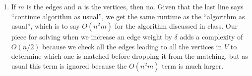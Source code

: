 \documentclass[a4paper]{article}
\begin{document}
\begin{enumerate}
\begin{enumerate}
\begin{algorithmic}
	\end{algorithmic}
	\item If $m$ is the edges and $n$ is the vertices, then no.  Given that the last line says ``continue algorithm as usual'', we get the same runtime as the ``algorithm as usual'', which is to say $O(n^2 m)$ for the algorithm discussed in class.  Our piece for solving when we increase an edge weight by $\delta$ adds a complexity of $O(n/2)$ because we check all the edges leading to all the vertices in $V$ to determine which one is matched before dropping it from the matching, but as usual this term is ignored because the $O(n^2 m)$ term is much larger.
	\end{enumerate}
\end{enumerate}
\end{document}
